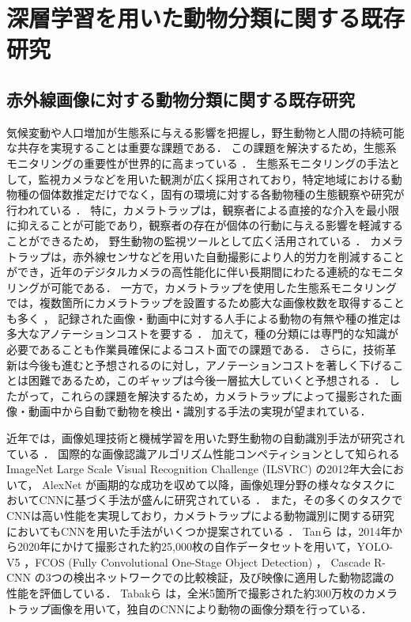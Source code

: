 
\chapter{深層学習を用いた動物分類に関する既存研究}

\section{赤外線画像に対する動物分類に関する既存研究}

気候変動や人口増加が生態系に与える影響を把握し，野生動物と人間の持続可能な共存を実現することは重要な課題である．
この課題を解決するため，生態系モニタリングの重要性が世界的に高まっている \cite{zwerts2021, bandaru2024}．
生態系モニタリングの手法として，監視カメラなどを用いた観測が広く採用されており，特定地域における動物種の個体数推定だけでなく，固有の環境に対する各動物種の生態観察や研究が行われている \cite{trolliet2014}．
特に，カメラトラップは，観察者による直接的な介入を最小限に抑えることが可能であり，観察者の存在が個体の行動に与える影響を軽減することができるため，
野生動物の監視ツールとして広く活用されている \cite{本郷2018, abood2023}．
カメラトラップは，赤外線センサなどを用いた自動撮影により人的労力を削減することができ，近年のデジタルカメラの高性能化に伴い長期間にわたる連続的なモニタリングが可能である．
一方で，カメラトラップを使用した生態系モニタリングでは，複数箇所にカメラトラップを設置するため膨大な画像枚数を取得することも多く \cite{kays2020, si2014}，
記録された画像・動画中に対する人手による動物の有無や種の推定は多大なアノテーションコストを要する \cite{thangaraj2023}．
加えて，種の分類には専門的な知識が必要であることも作業員確保によるコスト面での課題である．
さらに，技術革新は今後も進むと予想されるのに対し，アノテーションコストを著しく下げることは困難であるため，このギャップは今後一層拡大していくと予想される \cite{安藤2019}．
したがって，これらの課題を解決するため，カメラトラップによって撮影された画像・動画中から自動で動物を検出・識別する手法の実現が望まれている．

近年では，画像処理技術と機械学習を用いた野生動物の自動識別手法が研究されている \cite{manna2023, mohanty2022}．
国際的な画像認識アルゴリズム性能コンペティションとして知られるImageNet Large Scale Visual Recognition Challenge (ILSVRC) の2012年大会において，
AlexNet \cite{alexnet}が画期的な成功を収めて以降，画像処理分野の様々なタスクにおいてCNNに基づく手法が盛んに研究されている \cite{mohanty2016, sue2020}．
また，その多くのタスクでCNNは高い性能を実現しており，カメラトラップによる動物識別に関する研究においてもCNNを用いた手法がいくつか提案されている \cite{agarwal2023, neeli2023, abood2023, thangaraj2023}．
Tanら \cite{tan2022}は，2014年から2020年にかけて撮影された約25,000枚の自作データセットを用いて，YOLO-V5 \cite{yolov5}，FCOS (Fully Convolutional One-Stage Object Detection) \cite{fcos}，
Cascade R-CNN \cite{cascade}の3つの検出ネットワークでの比較検証，及び映像に適用した動物認識の性能を評価している．
Tabakら \cite{tabak2019}は，全米5箇所で撮影された約300万枚のカメラトラップ画像を用いて，独自のCNNにより動物の画像分類を行っている．

